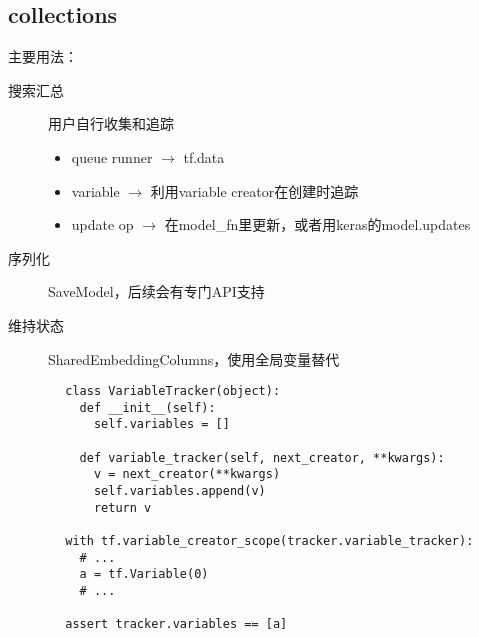
\subsection{collections}

\begin{frame}
    主要用法：
    \begin{description}
        \item[搜索汇总]  用户自行收集和追踪
            \begin{itemize}
                \item queue runner $\to$ tf.data
                \item variable $\to$ 利用variable creator在创建时追踪
                \item update op $\to$ 在model\_fn里更新，或者用keras的model.updates
            \end{itemize}
        \item[序列化]    SaveModel，后续会有专门API支持
        \item[维持状态]  SharedEmbeddingColumns，使用全局变量替代
    \end{description}
\end{frame}

\begin{frame}[fragile]
    \begin{verbatim}
        class VariableTracker(object):
          def __init__(self):
            self.variables = []

          def variable_tracker(self, next_creator, **kwargs):
            v = next_creator(**kwargs)
            self.variables.append(v)
            return v

        with tf.variable_creator_scope(tracker.variable_tracker):
          # ...
          a = tf.Variable(0)
          # ...

        assert tracker.variables == [a]
    \end{verbatim}
\end{frame}
